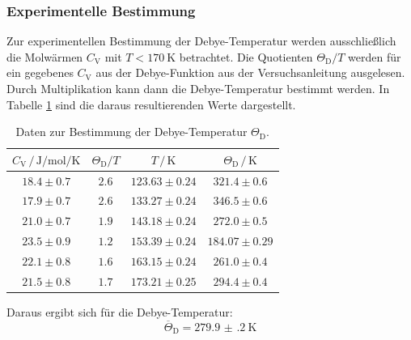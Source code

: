 \subsubsection{Experimentelle Bestimmung}
Zur experimentellen Bestimmung der Debye-Temperatur werden ausschließlich die Molwärmen $C_\mathrm{V}$ mit $T<\SI{170}{\kelvin}$ betrachtet.
Die Quotienten $\Theta_\mathrm{D} / T$ werden für ein gegebenes $C_\mathrm{V}$ aus der Debye-Funktion aus der Versuchsanleitung \cite[2,3]{Anleitung} ausgelesen.
Durch Multiplikation kann dann die Debye-Temperatur bestimmt werden. In Tabelle \ref{tab:tab3} sind die daraus resultierenden Werte dargestellt.
\begin{table}
  \centering
  \caption{Daten zur Bestimmung der Debye-Temperatur $\Theta_\mathrm{D}$.}
  \label{tab:tab3}
  \begin{tabular}{c c c c}
    \toprule
		$C_\mathrm{V} \, / \, \si{\joule\per\mole\per\kelvin}$ & $\Theta_\mathrm{D} / T$ & $T \, / \, \si{\kelvin}$ & $\Theta_\mathrm{D} \, / \, \si{\kelvin}$ \\
    \midrule
    $18.4\pm0.7$ & $2.6$ & $123.63\pm0.24$ & $321.4\pm0.6$ \\
    $17.9\pm0.7$ & $2.6$ & $133.27\pm0.24$ & $346.5\pm0.6$ \\
    $21.0\pm0.7$ & $1.9$ & $143.18\pm0.24$ & $272.0\pm0.5$ \\
    $23.5\pm0.9$ & $1.2$ & $153.39\pm0.24$ & $184.07\pm0.29$ \\
    $22.1\pm0.8$ & $1.6$ & $163.15\pm0.24$ & $261.0\pm0.4$ \\
    $21.5\pm0.8$ & $1.7$ & $173.21\pm0.25$ & $294.4\pm0.4$ \\
    \bottomrule
  \end{tabular}
\end{table}
\FloatBarrier
\noindent Daraus ergibt sich für die Debye-Temperatur:
\begin{equation*}
  \overline{\Theta}_\mathrm{D}=\SI{279.9(2)}{\kelvin}
\end{equation*}

